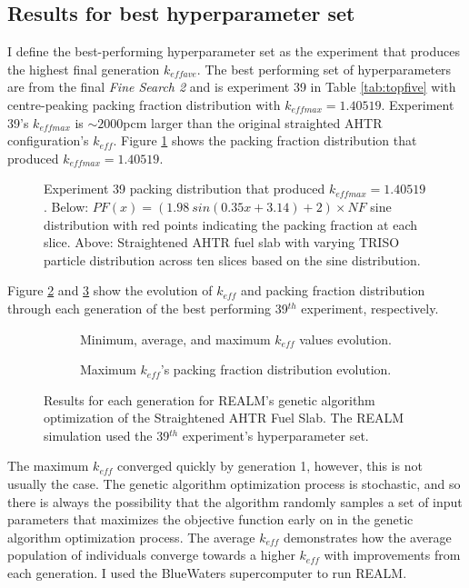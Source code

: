 \subsection{Results for best hyperparameter set}
I define the best-performing hyperparameter set as the experiment that produces 
the highest final generation $k_{eff ave}$. 
The best performing set of hyperparameters are from the final 
\textit{Fine Search 2} and is experiment 39 in Table \ref{tab:topfive}
with centre-peaking packing fraction distribution with $k_{eff max} = 1.40519$. 
Experiment 39's $k_{eff max}$ is $\sim2000$pcm larger than the original 
straighted \gls{AHTR} configuration's $k_{eff}$. 
Figure \ref{fig:triso_distribution_sine_39} shows the packing fraction distribution 
that produced $k_{eff max} = 1.40519$. 
\begin{figure}[]
    \centering
    \caption{Experiment 39 packing distribution that produced $k_{eff max} = 1.40519$. 
    Below: $PF(x) = (1.98\ sin(0.35x+3.14)+2)  \times NF$ sine distribution with 
    red points indicating the packing fraction at each slice. 
    Above: Straightened \acrlong{AHTR} fuel slab with varying \gls{TRISO} particle 
    distribution across ten slices based on the sine distribution. }
    \label{fig:triso_distribution_sine_39}
\end{figure}

Figure \ref{fig:keff_conv_39} and \ref{fig:pf_39} show the evolution of $k_{eff}$ 
and packing fraction distribution through each generation of the best performing 
39$^{th}$ experiment, respectively. 
\begin{figure}[]
    \centering
    \begin{subfigure}{\textwidth}
    \caption{Minimum, average, and maximum $k_{eff}$ values evolution.}
    \label{fig:keff_conv_39}
    \end{subfigure}
    \begin{subfigure}{\textwidth}
        \caption{Maximum $k_{eff}$'s packing fraction distribution evolution.}
        \label{fig:pf_39}
    \end{subfigure}
    \caption{ Results for each generation for REALM's genetic algorithm optimization 
    of the Straightened \acrfull{AHTR} Fuel Slab. The REALM simulation used 
    the 39$^{th}$ experiment's hyperparameter set.}
    \label{fig:39}
\end{figure}
The maximum $k_{eff}$ converged quickly by generation 1, however, this is not 
usually the case. 
The genetic algorithm optimization process is stochastic, and so there is always 
the possibility that the algorithm randomly samples a set of input parameters
that maximizes the objective function early on in the genetic algorithm 
optimization process. 
The average $k_{eff}$ demonstrates how the average population of individuals converge 
towards a higher $k_{eff}$ with improvements from each generation. 
I used the BlueWaters supercomputer to run REALM. 

